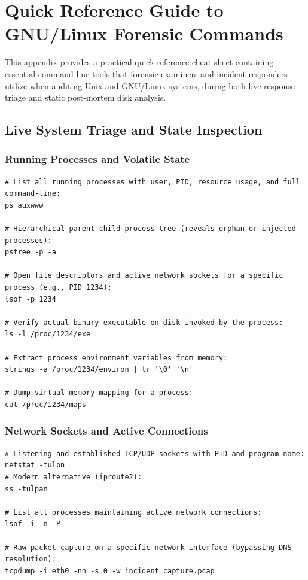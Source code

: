 \chapter{Quick Reference Guide to GNU/Linux Forensic Commands}

This appendix provides a practical quick-reference cheat sheet containing essential command-line tools that forensic examiners and incident responders utilize when auditing Unix and GNU/Linux systems, during both live response triage and static post-mortem disk analysis.

\section{Live System Triage and State Inspection}

\subsection{Running Processes and Volatile State}
\begin{lstlisting}[style=terminal]
# List all running processes with user, PID, resource usage, and full command-line:
ps auxwww

# Hierarchical parent-child process tree (reveals orphan or injected processes):
pstree -p -a

# Open file descriptors and active network sockets for a specific process (e.g., PID 1234):
lsof -p 1234

# Verify actual binary executable on disk invoked by the process:
ls -l /proc/1234/exe

# Extract process environment variables from memory:
strings -a /proc/1234/environ | tr '\0' '\n'

# Dump virtual memory mapping for a process:
cat /proc/1234/maps
\end{lstlisting}

\subsection{Network Sockets and Active Connections}
\begin{lstlisting}[style=terminal]
# Listening and established TCP/UDP sockets with PID and program name:
netstat -tulpn
# Modern alternative (iproute2):
ss -tulpan

# List all processes maintaining active network connections:
lsof -i -n -P

# Raw packet capture on a specific network interface (bypassing DNS resolution):
tcpdump -i eth0 -nn -s 0 -w incident_capture.pcap
\end{lstlisting}

